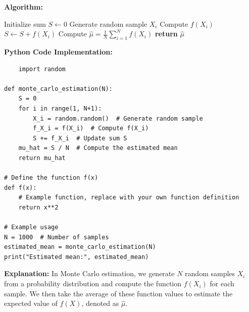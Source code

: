 \documentclass[12pt]{book} %
\begin{document}
\textbf{Algorithm:}
\FloatBarrier
\begin{algorithm}
\caption{Monte Carlo Estimation}
\begin{algorithmic}[1]
\State Initialize sum $S \gets 0$
    \State Generate random sample $X_i$
    \State Compute $f(X_i)$
    \State $S \gets S + f(X_i)$
\EndFor
\State Compute $\hat{\mu} = \frac{1}{N} \sum_{i=1}^{N} f(X_i)$
\State \textbf{return} $\hat{\mu}$
\end{algorithmic}
\end{algorithm}
\FloatBarrier

\textbf{Python Code Implementation:}
\FloatBarrier
\begin{lstlisting}
    import random

def monte_carlo_estimation(N):
    S = 0
    for i in range(1, N+1):
        X_i = random.random()  # Generate random sample
        f_X_i = f(X_i)  # Compute f(X_i)
        S += f_X_i  # Update sum S
    mu_hat = S / N  # Compute the estimated mean
    return mu_hat

# Define the function f(x)
def f(x):
    # Example function, replace with your own function definition
    return x**2

# Example usage
N = 1000  # Number of samples
estimated_mean = monte_carlo_estimation(N)
print("Estimated mean:", estimated_mean)
\end{lstlisting}
\FloatBarrier
\textbf{Explanation:} In Monte Carlo estimation, we generate $N$ random samples $X_i$ from a probability distribution and compute the function $f(X_i)$ for each sample. We then take the average of these function values to estimate the expected value of $f(X)$, denoted as $\hat{\mu}$.
\end{document}

